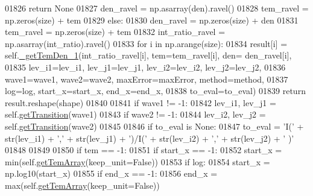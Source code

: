 \begin{DoxyCode}
01826                     \textcolor{keywordflow}{return} \textcolor{keywordtype}{None}
01827                 den\_ravel = np.asarray(den).ravel()
01828                 tem\_ravel = np.zeros(size) + tem
01829             \textcolor{keywordflow}{else}:
01830                 den\_ravel = np.zeros(size) + den
01831                 tem\_ravel = np.zeros(size) + tem
01832             int\_ratio\_ravel = np.asarray(int\_ratio).ravel()
01833             \textcolor{keywordflow}{for} i \textcolor{keywordflow}{in} np.arange(size):
01834                 result[i] = self.\hyperlink{classpyneb_1_1core_1_1pynebcore_1_1_atom_ad1d75f64b27a6acee079b5738b69dabe}{\_getTemDen\_1}(int\_ratio\_ravel[i], tem=tem\_ravel[i], den=
      den\_ravel[i],
01835                                            lev\_i1=lev\_i1, lev\_j1=lev\_j1, lev\_i2=lev\_i2, lev\_j2=lev\_j2,
01836                                            wave1=wave1, wave2=wave2, maxError=maxError, method=method,
01837                                            log=log, start\_x=start\_x, end\_x=end\_x,
01838                                            to\_eval=to\_eval)
01839             \textcolor{keywordflow}{return} result.reshape(shape)
01840             
01841         \textcolor{keywordflow}{if} wave1 != -1:
01842             lev\_i1, lev\_j1 = self.\hyperlink{classpyneb_1_1core_1_1pynebcore_1_1_atom_a7c9f17a3d9e841267add92377d9d1ede}{getTransition}(wave1)
01843         \textcolor{keywordflow}{if} wave2 != -1:
01844             lev\_i2, lev\_j2 = self.\hyperlink{classpyneb_1_1core_1_1pynebcore_1_1_atom_a7c9f17a3d9e841267add92377d9d1ede}{getTransition}(wave2)
01845 
01846         \textcolor{keywordflow}{if} to\_eval \textcolor{keywordflow}{is} \textcolor{keywordtype}{None}:
01847             to\_eval = \textcolor{stringliteral}{'I('} + str(lev\_i1) + \textcolor{stringliteral}{','} + str(lev\_j1) + \textcolor{stringliteral}{')/I('} + str(lev\_i2) + \textcolor{stringliteral}{','} + str(lev\_j2) + \textcolor{stringliteral}{'
      )'}
01848 
01849 
01850         \textcolor{keywordflow}{if} tem == -1:
01851             \textcolor{keywordflow}{if} start\_x == -1:
01852                 start\_x = min(self.\hyperlink{classpyneb_1_1core_1_1pynebcore_1_1_atom_a764cc048a87d3d89204a616774bdaac6}{getTemArray}(keep\_unit=\textcolor{keyword}{False}))
01853                 \textcolor{keywordflow}{if} log:
01854                     start\_x = np.log10(start\_x)
01855             \textcolor{keywordflow}{if} end\_x == -1:
01856                 end\_x = max(self.\hyperlink{classpyneb_1_1core_1_1pynebcore_1_1_atom_a764cc048a87d3d89204a616774bdaac6}{getTemArray}(keep\_unit=\textcolor{keyword}{False}))

\end{DoxyCode}
